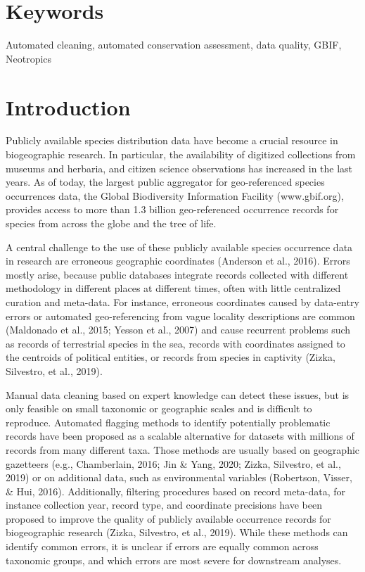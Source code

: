 \documentclass[
  12pt,
]{article}
\begin{document}
\hypertarget{keywords}{%
\section{Keywords}\label{keywords}}

Automated cleaning, automated conservation assessment, data quality, GBIF, Neotropics

\newpage{}

\hypertarget{introduction}{%
\section{Introduction}\label{introduction}}

Publicly available species distribution data have become a crucial resource in biogeographic research. In particular, the availability of digitized collections from museums and herbaria, and citizen science observations has increased in the last years. As of today, the largest public aggregator for geo-referenced species occurrences data, the Global Biodiversity Information Facility (www.gbif.org), provides access to more than 1.3 billion geo-referenced occurrence records for species from across the globe and the tree of life.

A central challenge to the use of these publicly available species occurrence data in research are erroneous geographic coordinates (Anderson et al., 2016). Errors mostly arise, because public databases integrate records collected with different methodology in different places at different times, often with little centralized curation and meta-data. For instance, erroneous coordinates caused by data-entry errors or automated geo-referencing from vague locality descriptions are common (Maldonado et al., 2015; Yesson et al., 2007) and cause recurrent problems such as records of terrestrial species in the sea, records with coordinates assigned to the centroids of political entities, or records from species in captivity (Zizka, Silvestro, et al., 2019).

Manual data cleaning based on expert knowledge can detect these issues, but is only feasible on small taxonomic or geographic scales and is difficult to reproduce. Automated flagging methods to identify potentially problematic records have been proposed as a scalable alternative for datasets with millions of records from many different taxa. Those methods are usually based on geographic gazetteers (e.g., Chamberlain, 2016; Jin \& Yang, 2020; Zizka, Silvestro, et al., 2019) or on additional data, such as environmental variables (Robertson, Visser, \& Hui, 2016). Additionally, filtering procedures based on record meta-data, for instance collection year, record type, and coordinate precisions have been proposed to improve the quality of publicly available occurrence records for biogeographic research (Zizka, Silvestro, et al., 2019). While these methods can identify common errors, it is unclear if errors are equally common across taxonomic groups, and which errors are most severe for downstream analyses.
\end{document}
